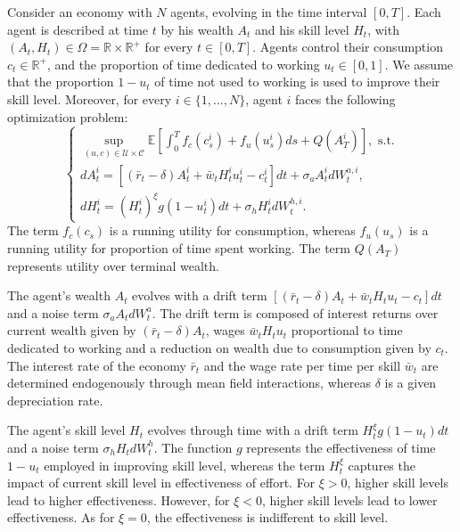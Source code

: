 Consider an economy with $N$ agents, evolving in the time interval $[0,T]$.
Each agent is described at time $t$ by his wealth $A_t$ and his skill level $H_t$,
with $(A_t, H_t) \in \Omega = \mathbb{R} \times \mathbb{R}^+$ for every $t \in [0,T]$.
Agents control their consumption $c_t \in \mathbb{R}^+$, and the proportion of time dedicated to working $u_t \in [0,1]$. 
We assume that the proportion $1 - u_t$ of time not used to working is used to improve their skill level. 
Moreover, for every $i \in \{1,...,N\}$,  agent $i$ faces the following optimization problem:
\begin{equation}\label{education_model:representative_agent_optimization}
\begin{cases}
        \sup\limits_{(u,c) \in \mathcal{U} \times \mathcal{C}}\mathbb{E} [ \int_0^T f_c(c^i_s) + f_u(u^i_s) ds + Q(A^i_T) ], \text{ s.t.}\\
        d A^i_t = \left[ (\bar r_t - \delta) A^i_t + \bar w_t H^i_t u^i_t - c^i_t  \right] dt + \sigma_a A^i_t d W^{a,i}_t,\\
        d H^i_t = (H^i_t)^\xi g(1 - u^i_t) dt + \sigma_h H^i_t d W^{h,i}_t.
\end{cases}
\end{equation}
The term $f_c(c_s)$ is a running utility for consumption, whereas $f_u(u_s)$ is a running utility for proportion of time spent working.
The term $Q(A_T)$ represents utility over terminal wealth.

The agent's wealth $A_t$ evolves with a drift term $\left[ (\bar r_t - \delta) A_t + \bar w_t H_t u_t - c_t  \right] dt $ and a noise term $\sigma_a A_t d W^a_t$.
The drift term is composed of interest returns over current wealth given by $(\bar r_t - \delta) A_t$, wages $\bar w_t H_t u_t$  proportional to time dedicated to working and a reduction on wealth due to consumption given by $c_t$. The interest rate of the economy $\bar r_t$ and the wage rate per time per skill $\bar w_t$  are determined endogenously through mean field interactions, whereas $\delta$ is a given depreciation rate. 

The agent's skill level $H_t$ evolves through time with a drift term $H^\xi_t g(1 - u_t) dt$ and a noise term $\sigma_h H_t dW^h_t$.
The function $g$ represents the effectiveness of time $1 - u_t$ employed in improving skill level,
 whereas the term $H_t^\xi$ captures the impact of current skill level in effectiveness of effort.
 For $\xi > 0$, higher skill levels lead to higher effectiveness.
  However, for $\xi < 0$, higher skill levels lead to lower effectiveness.
  As for $\xi = 0$, the effectiveness is indifferent to skill level.

